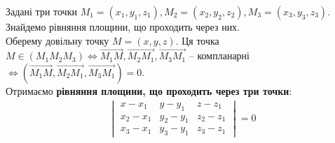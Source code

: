 \documentclass[a4paper, 10pt]{extarticle}
\theoremstyle{theoremdd}
\theoremstyle{theoremdd}
\theoremstyle{theoremdd}
\theoremstyle{theoremdd}
\theoremstyle{theoremdd}
\theoremstyle{theoremdd}
\theoremstyle{theoremdd}
\theoremstyle{theoremdd}
\begin{document}
Задані три точки $M_1 = (x_1,y_1,z_1), M_2 = (x_2,y_2,z_2), M_3 = (x_3,y_3,z_3)$. Знайдемо рівняння площини, що проходить через них.\\
Оберему довільну точку $M = (x,y,z)$. Ця точка $M \in (M_1 M_2 M_3) \iff \overrightarrow{M_1M}, \overrightarrow{M_2M_1}, \overrightarrow{M_3M_1}$ -- компланарні $\iff (\overrightarrow{M_1M}, \overrightarrow{M_2M_1}, \overrightarrow{M_3M_1}) = 0$.\\
Отримаємо \textbf{рівняння площини, що проходить через три точки}:
\begin{align*}
\begin{vmatrix}
x-x_1 & y-y_1 & z-z_1 \\
x_2-x_1 & y_2-y_1 & z_2-z_1 \\
x_3-x_1 & y_3-y_1 & z_3-z_1
\end{vmatrix} = 0
\end{align*}

\begin{figure}[H]
\centering
{}
\end{figure}
\end{document}
